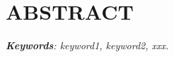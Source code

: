 
\chapter*{ABSTRACT}
\thispagestyle{plain}

\vspace*{0.7cm}
\lipsum[1]
\vspace*{1 cm}

\textit{\noindent\textbf{Keywords}: keyword1, keyword2, xxx.}
\newpage
\newpage